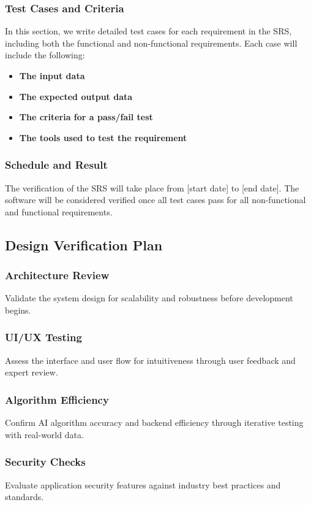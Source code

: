 \documentclass[12pt, titlepage]{article}
\begin{document}
\subsubsection{Test Cases and Criteria}
In this section, we write detailed test cases for each requirement in the SRS, including both the functional and non-functional requirements. Each case will include the following:

\begin{itemize}
  \item \textbf{The input data}
  \item \textbf{The expected output data}
  \item \textbf{The criteria for a pass/fail test}
  \item \textbf{The tools used to test the requirement}
\end{itemize}

\subsubsection{Schedule and Result}
The verification of the SRS will take place from [start date] to [end date]. The software will be considered verified once all test cases pass for all non-functional and functional requirements.

\subsection{Design Verification Plan}

\subsubsection{Architecture Review}
Validate the system design for scalability and robustness before development begins.

\subsubsection{UI/UX Testing}
Assess the interface and user flow for intuitiveness through user feedback and expert review.

\subsubsection{Algorithm Efficiency}
Confirm AI algorithm accuracy and backend efficiency through iterative testing with real-world data.

\subsubsection{Security Checks}
Evaluate application security features against industry best practices and standards.
\end{document}
